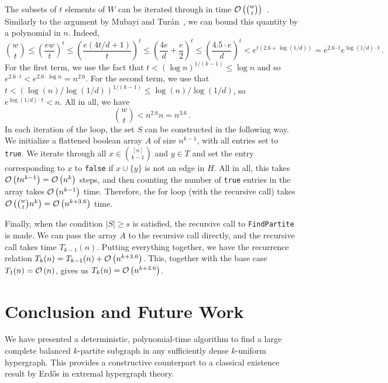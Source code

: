 The subsets of $t$ elements of $W$ can be iterated through in time $\mathcal{O}\left(\binom{w}{t}\right)$~\cite{reingold1977combinatorial}.
Similarly to the argument by Mubayi and Tur\'{a}n~\cite{MUBAYI2010174}, we can bound this quantity by a polynomial in $n$.
Indeed,
\[
    \binom{w}{t} \leq \left(\frac{ew}{t}\right)^t
    \leq \left(\frac{e(4t/d + 1)}{t}\right)^t
    \leq \left(\frac{4e}{d} + \frac{e}{2}  \right)^t
    \leq \left(\frac{4.5 \cdot e}{d}\right)^t < e^{t(2.6 + \log (1/d))}
    = e^{2.6 \cdot t} e^{\log (1/d) \cdot t}\,.
\]
For the first term, we use the fact that $t < (\log n)^{1/(k-1)} \leq \log n$
and so ${e^{2.6 \cdot t} < e^{2.6 \cdot \log n} = n^{2.6}}$.
For the second term, we use that $t < (\log(n)/\log(1/d))^{1/(k-1)} \leq \log(n)/\log(1/d)$,
so $e^{\log (1/d) \cdot t} < n$.
All in all, we have
\[
    \binom{w}{t} < n^{2.6} n = n^{3.6}\,.
\]
In each iteration of the loop, the set $S$ can be constructed in the following way.
We initialize a flattened boolean array $A$ of size $n^{k-1}$,
with all entries set to \texttt{true}.
We iterate through all $x \in \binom{[n]}{k-1}$ and $y \in T$
and set the entry corresponding to $x$ to \texttt{false} if $x \cup \{y\}$ is not an edge in $H$.
All in all, this takes $\mathcal{O}\left(tn^{k-1}\right) = \mathcal{O}\left(n^k\right)$ steps, and then counting the number of \texttt{true} entries in the array takes $\mathcal{O}\left(n^{k-1}\right)$ time.
Therefore, the for loop (with the recursive call) takes $\mathcal{O}\left(\binom{w}{t} n^{k}\right) = \mathcal{O}\left(n^{k+3.6}\right)$ time.

Finally, when the condition $|S| \geq s$ is satisfied, the recursive call to \texttt{FindPartite} is made.
We can pass the array $A$ to the recursive call directly, and the recursive call takes time $T_{k-1}(n)$.
Putting everything together, we have the recurrence relation $T_k(n) = T_{k-1}(n) + \mathcal{O}\left(n^{k+3.6}\right)$.
This, together with the base case $T_1(n) = \mathcal{O}\left(n\right)$, gives us $T_k(n) = \mathcal{O}\left(n^{k+3.6}\right)$.

\section{Conclusion and Future Work}\label{sec:conclusion-and-future-work}

We have presented a deterministic,
polynomial-time algorithm to find a large complete balanced $k$-partite subgraph in any sufficiently dense $k$-uniform hypergraph.
This provides a constructive counterpart to a classical existence result by Erd\H{o}s in extremal hypergraph theory.

